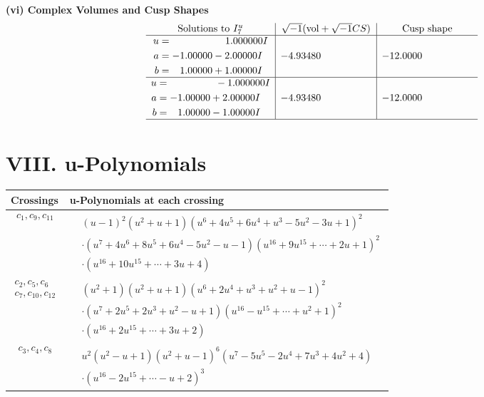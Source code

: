\documentclass[1p]{elsarticle_modified}
\theoremstyle{definition}
\newcommand{\I}{\sqrt{-1}}
\begin{document}
\newpage\flushleft \textbf{(vi) Complex Volumes and Cusp Shapes}
$$\begin{array}{c|c|c}  
\text{Solutions to }I^u_{7}& \I (\text{vol} + \sqrt{-1}CS) & \text{Cusp shape}\\
 \hline 
\begin{aligned}
u &= \phantom{-0.000000 -}1.000000 I \\
a &= -1.00000 - 2.00000 I \\
b &= \phantom{-}1.00000 + 1.00000 I\end{aligned}
 & -4.93480\phantom{ +0.000000I} & -12.0000\phantom{ +0.000000I} \\ \hline\begin{aligned}
u &= \phantom{-0.000000 } -1.000000 I \\
a &= -1.00000 + 2.00000 I \\
b &= \phantom{-}1.00000 - 1.00000 I\end{aligned}
 & -4.93480\phantom{ +0.000000I} & -12.0000\phantom{ +0.000000I}\\
 \hline 
 \end{array}$$\newpage
\newpage\renewcommand{\arraystretch}{1}
\centering \section*{ VIII. u-Polynomials}
\begin{tabular}{m{50pt}|m{274pt}}
Crossings & \hspace{64pt}u-Polynomials at each crossing \\
\hline $$\begin{aligned}c_{1},c_{9},c_{11}\end{aligned}$$&$\begin{aligned}
&(u-1)^2(u^2+u+1)(u^6+4 u^5+6 u^4+u^3-5 u^2-3 u+1)^2\\
&\cdot(u^7+4 u^6+8 u^5+6 u^4-5 u^2- u-1)(u^{16}+9 u^{15}+\cdots+2 u+1)^{2}\\
&\cdot(u^{16}+10 u^{15}+\cdots+3 u+4)
\end{aligned}$\\
\hline $$\begin{aligned}c_{2},c_{5},c_{6}\\c_{7},c_{10},c_{12}\end{aligned}$$&$\begin{aligned}
&(u^2+1)(u^2+u+1)(u^6+2 u^4+u^3+u^2+u-1)^2\\
&\cdot(u^7+2 u^5+2 u^3+u^2- u+1)(u^{16}- u^{15}+\cdots+u^2+1)^{2}\\
&\cdot(u^{16}+2 u^{15}+\cdots+3 u+2)
\end{aligned}$\\
\hline $$\begin{aligned}c_{3},c_{4},c_{8}\end{aligned}$$&$\begin{aligned}
&u^2(u^2- u+1)(u^2+u-1)^6(u^7-5 u^5-2 u^4+7 u^3+4 u^2+4)\\
&\cdot(u^{16}-2 u^{15}+\cdots- u+2)^{3}
\end{aligned}$\\
\hline
\end{tabular}\newpage\renewcommand{\arraystretch}{1}
\end{document}

